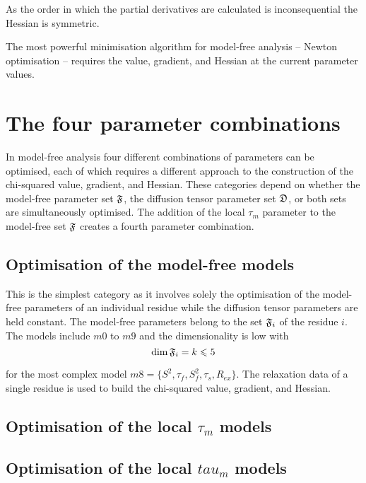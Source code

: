 \noindent As the order in which the partial derivatives are calculated is inconsequential the Hessian is symmetric.

The most powerful minimisation algorithm for model-free analysis -- Newton optimisation -- requires the value, gradient, and Hessian at the current parameter values.




\section{The four parameter combinations}

In model-free analysis four different combinations of parameters can be optimised, each of which requires a different approach to the construction of the chi-squared value, gradient, and Hessian.  These categories depend on whether the model-free parameter set $\mathfrak{F}$, the diffusion tensor parameter set $\mathfrak{D}$, or both sets are simultaneously optimised.  The addition of the local $\tau_m$ parameter to the model-free set $\mathfrak{F}$ creates a fourth parameter combination.





\subsection{Optimisation of the model-free models}

This is the simplest category as it involves solely the optimisation of the model-free parameters of an individual residue while the diffusion tensor parameters are held constant.  The model-free parameters belong to the set $\mathfrak{F}_i$ of the residue $i$.  The models include $m0$ to $m9$ and the dimensionality is low with
\begin{equation}
    \dim \mathfrak{F}_i = k \leqslant 5
\end{equation}

\noindent for the most complex model $m8 = \{S^2, \tau_f, S^2_f, \tau_s, R_{ex}\}$.  The relaxation data of a single residue is used to build the chi-squared value, gradient, and Hessian.



\begin{latexonly}
    \subsection{Optimisation of the local $\tau_m$ models}
\end{latexonly}
\begin{htmlonly}
    \subsection{Optimisation of the local $tau_m$ models}
\end{htmlonly}

